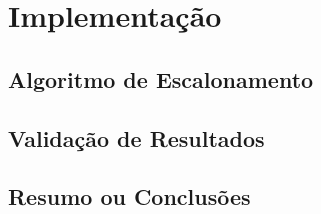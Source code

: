 \chapter{Implementação}\label{chap:implementacao}

\section*{}



\section{Algoritmo de Escalonamento}






\section{Validação de Resultados}








\section{Resumo ou Conclusões}


